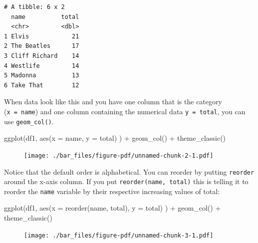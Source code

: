 \documentclass[
  letterpaper,
  DIV=11,
  numbers=noendperiod]{scrreprt}
\newenvironment{Shaded}{\begin{snugshade}}{\end{snugshade}}
\newcommand{\AttributeTok}[1]{\textcolor[rgb]{0.40,0.45,0.13}{#1}}
\newcommand{\FunctionTok}[1]{\textcolor[rgb]{0.28,0.35,0.67}{#1}}
\newcommand{\NormalTok}[1]{\textcolor[rgb]{0.00,0.23,0.31}{#1}}
\newcommand{\SpecialCharTok}[1]{\textcolor[rgb]{0.37,0.37,0.37}{#1}}
\begin{document}
\begin{verbatim}
# A tibble: 6 x 2
  name          total
  <chr>         <dbl>
1 Elvis            21
2 The Beatles      17
3 Cliff Richard    14
4 Westlife         14
5 Madonna          13
6 Take That        12
\end{verbatim}

When data look like this and you have one column that is the category
(\texttt{x\ =\ name}) and one column containing the numerical data
\texttt{y\ =\ total}, you can use \texttt{geom\_col()}.

\begin{Shaded}
\begin{Highlighting}[]
\FunctionTok{ggplot}\NormalTok{(df1, }\FunctionTok{aes}\NormalTok{(}\AttributeTok{x =}\NormalTok{ name, }\AttributeTok{y =}\NormalTok{ total) ) }\SpecialCharTok{+} 
  \FunctionTok{geom\_col}\NormalTok{() }\SpecialCharTok{+}
  \FunctionTok{theme\_classic}\NormalTok{()}
\end{Highlighting}
\end{Shaded}

\begin{figure}[H]

{\centering \texttt{[image: ./bar\_files/figure-pdf/unnamed-chunk-2-1.pdf]}

}

\end{figure}

Notice that the default order is alphabetical. You can reorder by
putting \texttt{reorder} around the x-axis column. If you put
\texttt{reorder(name,\ total)} this is telling it to reorder the
\texttt{name} variable by their respective increasing values of total:

\begin{Shaded}
\begin{Highlighting}[]
\FunctionTok{ggplot}\NormalTok{(df1, }\FunctionTok{aes}\NormalTok{(}\AttributeTok{x =} \FunctionTok{reorder}\NormalTok{(name, total), }\AttributeTok{y =}\NormalTok{ total) ) }\SpecialCharTok{+}
  \FunctionTok{geom\_col}\NormalTok{() }\SpecialCharTok{+}
  \FunctionTok{theme\_classic}\NormalTok{()}
\end{Highlighting}
\end{Shaded}

\begin{figure}[H]

{\centering \texttt{[image: ./bar\_files/figure-pdf/unnamed-chunk-3-1.pdf]}

}

\end{figure}
\end{document}
